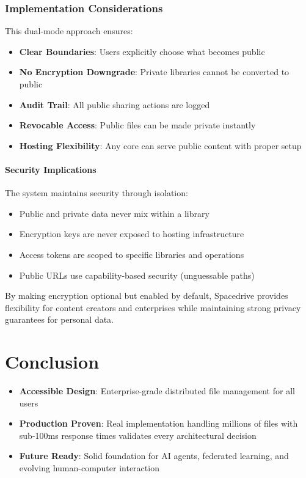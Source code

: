 \documentclass[sigconf]{acmart}
\begin{document}
\subsubsection{Implementation Considerations}

This dual-mode approach ensures:

\begin{itemize}
    \item \textbf{Clear Boundaries}: Users explicitly choose what becomes public
    \item \textbf{No Encryption Downgrade}: Private libraries cannot be converted to public
    \item \textbf{Audit Trail}: All public sharing actions are logged
    \item \textbf{Revocable Access}: Public files can be made private instantly
    \item \textbf{Hosting Flexibility}: Any core can serve public content with proper setup
\end{itemize}

\paragraph{Security Implications}
The system maintains security through isolation:

\begin{itemize}
    \item Public and private data never mix within a library
    \item Encryption keys are never exposed to hosting infrastructure
    \item Access tokens are scoped to specific libraries and operations
    \item Public URLs use capability-based security (unguessable paths)
\end{itemize}

By making encryption optional but enabled by default, Spacedrive provides flexibility for content creators and enterprises while maintaining strong privacy guarantees for personal data.





\section{Conclusion}

\begin{keytakeaways}
\begin{itemize}[noitemsep, topsep=0pt]
\item \textbf{Accessible Design}: Enterprise-grade distributed file management for all users
\item \textbf{Production Proven}: Real implementation handling millions of files with sub-100ms response times validates every architectural decision
\item \textbf{Future Ready}: Solid foundation for AI agents, federated learning, and evolving human-computer interaction
\end{itemize}
\end{keytakeaways}
\end{document}
